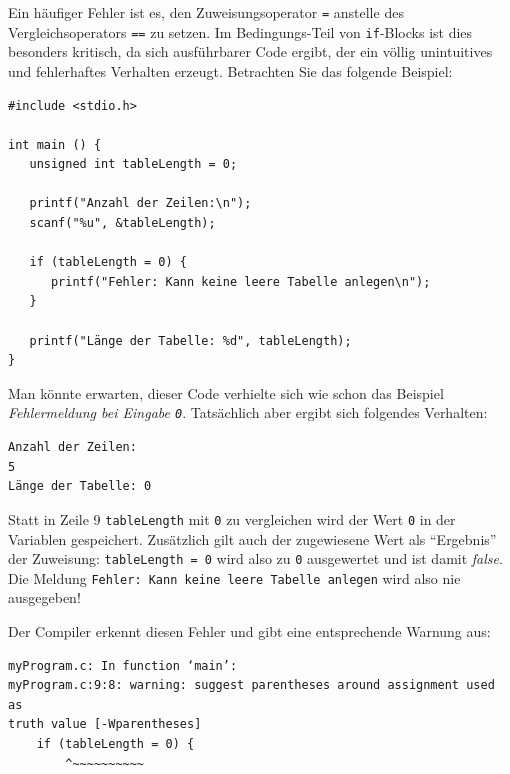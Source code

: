 \begin{warnbox}[Fehlerquelle: Vergleichsoperator \texttt{==} vs. Zuweisungsoperator \texttt{=}]
Ein häufiger Fehler ist es, den Zuweisungsoperator \texttt{=} anstelle des Vergleichsoperators \texttt{==} zu setzen. Im Bedingungs-Teil von \texttt{if}-Blocks ist dies besonders kritisch, da sich ausführbarer Code ergibt, der ein völlig unintuitives und fehlerhaftes Verhalten erzeugt. Betrachten Sie das folgende Beispiel:

\begin{warnbox}[Beispiel: \texttt{if} mit versehentlicher Wertzuweisung, leftupper=7mm]
\begin{verbatim}
#include <stdio.h>

int main () {
   unsigned int tableLength = 0;

   printf("Anzahl der Zeilen:\n");
   scanf("%u", &tableLength);

   if (tableLength = 0) {
      printf("Fehler: Kann keine leere Tabelle anlegen\n");
   }

   printf("Länge der Tabelle: %d", tableLength);
}
\end{verbatim}
\end{warnbox}
\end{warnbox}

\begin{warnbox}[]
Man könnte erwarten, dieser Code verhielte sich wie schon das Beispiel \emph{Fehlermeldung bei Eingabe \texttt{0}}. Tatsächlich aber ergibt sich folgendes Verhalten:

\begin{cmdbox}
\begin{verbatim}
Anzahl der Zeilen:
5
Länge der Tabelle: 0
\end{verbatim}
\end{cmdbox}

Statt in Zeile 9 \texttt{tableLength} mit \texttt{0} zu vergleichen wird der Wert \texttt{0} in der Variablen gespeichert. Zusätzlich gilt auch der zugewiesene Wert als \enquote{Ergebnis} der Zuweisung: \texttt{tableLength = 0} wird also zu \texttt{0} ausgewertet und ist damit \emph{false}. Die Meldung \texttt{Fehler: Kann keine leere Tabelle anlegen} wird also nie ausgegeben!

Der Compiler erkennt diesen Fehler und gibt eine entsprechende Warnung aus:

\begin{cmdbox}
\begin{verbatim}
myProgram.c: In function ‘main’:
myProgram.c:9:8: warning: suggest parentheses around assignment used as
truth value [-Wparentheses]
    if (tableLength = 0) {
        ^~~~~~~~~~~
\end{verbatim}
\end{cmdbox}
\end{warnbox}

